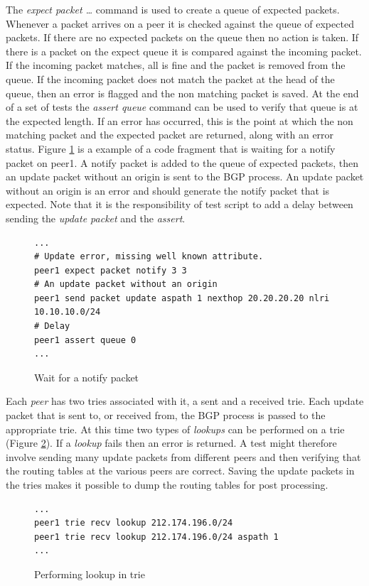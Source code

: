 \documentclass[11pt]{article}
\begin{document}
The {\em expect packet \ldots} command is used to create a queue of
expected packets. Whenever a packet arrives on a peer it is checked
against the queue of expected packets. If there are no expected packets
on the queue then no action is taken. If there is a packet on the
expect queue it is compared against the incoming packet. If the
incoming packet matches,
all is fine and the packet is removed from the queue. If the incoming
packet does not match the packet at the head of the queue, then an
error is flagged and the non matching packet is saved. At the end of a
set of tests the {\em assert queue} command can be used to verify that
queue is at the expected length. If an error has occurred, this is the
point at which the non matching packet and the expected packet are
returned, along with an error status. Figure \ref{prog:assert} is a
example of a code fragment that is waiting for a notify packet on
peer1. A notify packet is added to the queue of expected
packets, then an update packet without an origin is sent to the BGP
process. An update packet without an origin is an error and should
generate the notify packet that is expected. Note that it is
the responsibility of test script to add a delay between sending the
{\em update packet} and the {\em assert}.

\begin{figure}[htb]
\small
\begin{verbatim}
...
# Update error, missing well known attribute.
peer1 expect packet notify 3 3
# An update packet without an origin
peer1 send packet update aspath 1 nexthop 20.20.20.20 nlri 10.10.10.0/24
# Delay
peer1 assert queue 0
...
\end{verbatim}
\vspace{-0.1in}
\caption{\label{prog:assert}Wait for a notify packet}
\end{figure}

Each {\em peer} has two tries associated with it, a sent and a
received trie. Each update packet that is sent to, or received from,
the BGP process is passed to the appropriate trie. At this time two
types of {\em lookups} can be performed on a trie (Figure
\ref{prog:trie_lookup}). If a {\em lookup} fails then an error is
returned. A test might therefore involve sending many update packets
from different peers and then verifying that the routing tables at the
various peers are correct.  Saving the update packets in the tries
makes it possible to dump the routing tables for post processing.

\begin{figure}[htb]
\small
\begin{verbatim}
...
peer1 trie recv lookup 212.174.196.0/24
peer1 trie recv lookup 212.174.196.0/24 aspath 1
...
\end{verbatim}
\vspace{-0.1in}
\caption{\label{prog:trie_lookup}Performing lookup in trie}
\end{figure}
\end{document}
